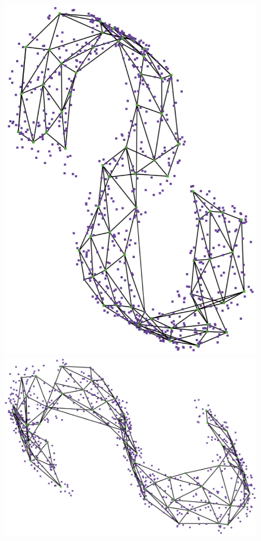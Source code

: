 \documentclass[
  12pt]{article}
\begin{document}
\begin{figure}[H]
\begin{minipage}{0.25\linewidth}
\includegraphics{figures/scurve/sc_tsne_best_1.png}\end{minipage}%
%
\begin{minipage}{0.25\linewidth}
\includegraphics{figures/scurve/sc_tsne_best_2.png}\end{minipage}%

\end{figure}
\end{document}
